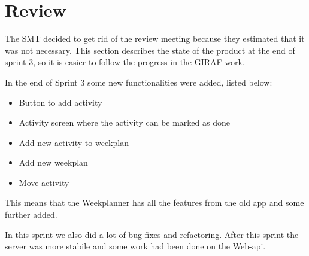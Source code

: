 \section{Review}
The \gls{SMT} decided to get rid of the review meeting because they estimated that it was not necessary. This section describes the state of the product at the end of sprint 3, so it is easier to follow the progress in the GIRAF work. 

In the end of Sprint 3 some new functionalities were added, listed below:
\begin{itemize}
    \item Button to add activity
    \item Activity screen where the activity can be marked as done
    \item Add new activity to weekplan
    \item Add new weekplan
    \item Move activity
\end{itemize}

This means that the Weekplanner has all the features from the old app and some further added. 

In this sprint we also did a lot of bug fixes and refactoring. After this sprint the server was more stabile and some work had been done on the Web-api.